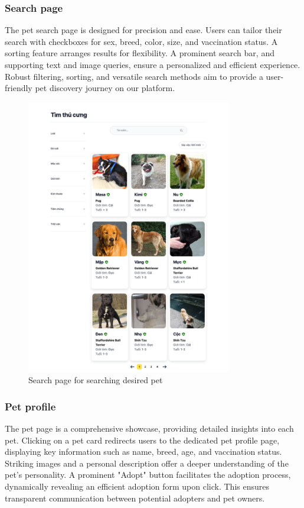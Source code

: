 \subsubsection{Search page}

The pet search page is designed for precision and ease. Users can tailor their search 
with checkboxes for sex, breed, color, size, and vaccination status. A sorting feature 
arranges results for flexibility. A prominent search bar, and supporting text and image
 queries, ensure a personalized and efficient experience. Robust filtering, sorting, and 
 versatile search methods aim to provide a user-friendly pet discovery journey on our platform.

\begin{figure}[H]
    \centering
    \includegraphics[width=0.8\textwidth]{Figures/UI/search_ui.png}
    \caption{Search page for searching desired pet}
\end{figure}


\subsubsection{Pet profile}

The pet page is a comprehensive showcase, providing detailed insights into each pet. Clicking on a pet card redirects users to the dedicated pet profile page, displaying key information such as name, breed, age, and vaccination status. Striking images and a personal description offer a deeper understanding of the pet's personality. A prominent "Adopt" button facilitates the adoption process, dynamically revealing an efficient adoption form upon click. This ensures transparent communication between potential adopters and pet owners.

